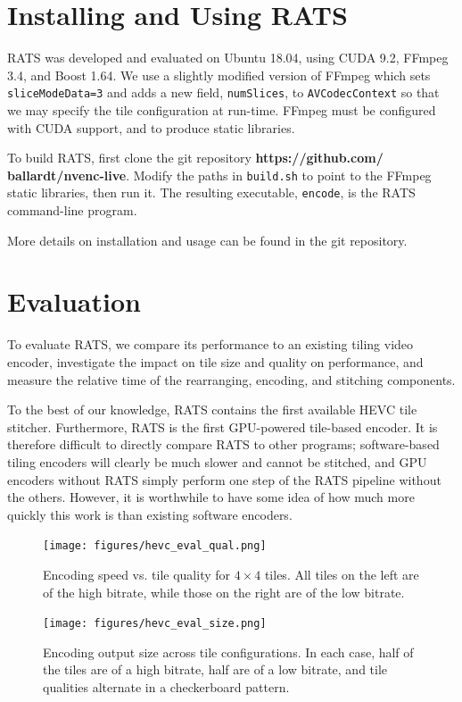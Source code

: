 \section{Installing and Using RATS}
RATS was developed and evaluated on Ubuntu 18.04, using CUDA 9.2, FFmpeg 3.4, and Boost 1.64. We use a slightly modified version of FFmpeg which sets \texttt{sliceModeData=3} and adds a new field, \texttt{numSlices}, to \texttt{AVCodecContext} so that we may specify the tile configuration at run-time. FFmpeg must be configured with CUDA support, and to produce static libraries.

To build RATS, first clone the git repository \textbf{https://github.com/\\ballardt/nvenc-live}. Modify the paths in \texttt{build.sh} to point to the FFmpeg static libraries, then run it. The resulting executable, \texttt{encode}, is the RATS command-line program.

More details on installation and usage can be found in the git repository.

\section{Evaluation}
To evaluate RATS, we compare its performance to an existing tiling video encoder, investigate the impact on tile size and quality on performance, and measure the relative time of the rearranging, encoding, and stitching components.

To the best of our knowledge, RATS contains the first available HEVC tile stitcher. Furthermore, RATS is the first GPU-powered tile-based encoder. It is therefore difficult to directly compare RATS to other programs; software-based tiling encoders will clearly be much slower and cannot be stitched, and GPU encoders without RATS simply perform one step of the RATS pipeline without the others. However, it is worthwhile to have some idea of how much more quickly this work is than existing software encoders. 

\begin{figure}[t]
	\texttt{[image: figures/hevc\_eval\_qual.png]}
	\caption{Encoding speed vs. tile quality for $4\times4$ tiles. All tiles on the left are of the high bitrate, while those on the right are of the low bitrate.}
\end{figure}

\begin{figure}[t]
	\texttt{[image: figures/hevc\_eval\_size.png]}
	\caption{Encoding output size across tile configurations. In each case, half of the tiles are of a high bitrate, half are of a low bitrate, and tile qualities alternate in a checkerboard pattern.}
\end{figure}

